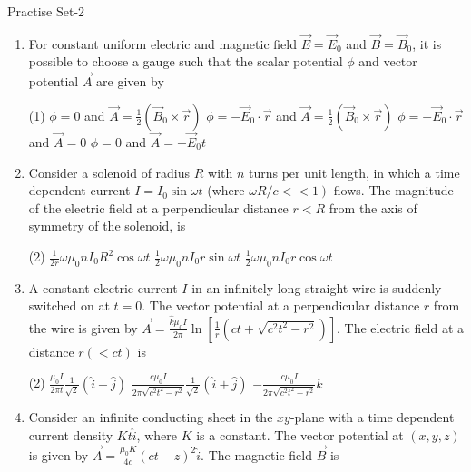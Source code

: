 \newpage
\begin{abox}
Practise Set-2
\end{abox}
\begin{enumerate}
	\item  For constant uniform electric and magnetic field $\vec{E}=\vec{E}_{0}$ and $\vec{B}=\vec{B}_{0}$, it is possible to choose a gauge such that the scalar potential $\phi$ and vector potential $\vec{A}$ are given by
		{}
		\begin{tasks}(1)
			\task[\textbf{A.}] $\phi=0$ and $\vec{A}=\frac{1}{2}\left(\vec{B}_{0} \times \vec{r}\right)$
			\task[\textbf{B.}] $\phi=-\vec{E}_{0} \cdot \vec{r}$ and $\vec{A}=\frac{1}{2}\left(\vec{B}_{0} \times \vec{r}\right)$
			\task[\textbf{C.}]  $\phi=-\vec{E}_{0} \cdot \vec{r}$ and $\vec{A}=0$
			\task[\textbf{D.}] $\phi=0$ and $\vec{A}=-\vec{E}_{0} t$
		\end{tasks}
	\item	Consider a solenoid of radius $R$ with $n$ turns per unit length, in which a time dependent current $I=I_{0} \sin \omega t$ (where $\left.\omega R / c<<1\right)$ flows. The magnitude of the electric field at a perpendicular distance $r<R$ from the axis of symmetry of the solenoid, is
		{\exyear{NET/JRF(DEC-2011)}}
		\begin{tasks}(2)
			\task[\textbf{A.}]  0
			\task[\textbf{B.}] $\frac{1}{2 r} \omega \mu_{0} n I_{0} R^{2} \cos \omega t$
			\task[\textbf{C.}] $\frac{1}{2} \omega \mu_{0} n I_{0} r \sin \omega t$
			\task[\textbf{D.}]  $\frac{1}{2} \omega \mu_{0} n I_{0} r \cos \omega t$
		\end{tasks}
\item	A constant electric current $I$ in an infinitely long straight wire is suddenly switched on at $t=0$. The vector potential at a perpendicular distance $r$ from the wire is given by $\vec{A}=\frac{\hat{k} \mu_{0} I}{2 \pi} \ln \left[\frac{1}{r}\left(c t+\sqrt{c^{2} t^{2}-r^{2}}\right)\right]$. The electric field at a distance $r(<c t)$ is
		{}
		\begin{tasks}(2)
			\task[\textbf{B.}] $\frac{\mu_{0} I}{2 \pi t} \frac{1}{\sqrt{2}}(\hat{i}-\hat{j})$
			\task[\textbf{C.}] $\frac{c \mu_{0} I}{2 \pi \sqrt{c^{2} t^{2}-r^{2}}} \frac{1}{\sqrt{2}}(\hat{i}+\hat{j})$
			\task[\textbf{D.}] $-\frac{c \mu_{0} I}{2 \pi \sqrt{c^{2} t^{2}-r^{2}}} \hat{k}$
		\end{tasks}
\item Consider an infinite conducting sheet in the $x y$-plane with a time dependent current density $K t \hat{i}$, where $K$ is a constant. The vector potential at $(x, y, z)$ is given by $\vec{A}=\frac{\mu_{0} K}{4 c}(c t-z)^{2} \hat{i}$. The magnetic field $\vec{B}$ is

\end{enumerate}
